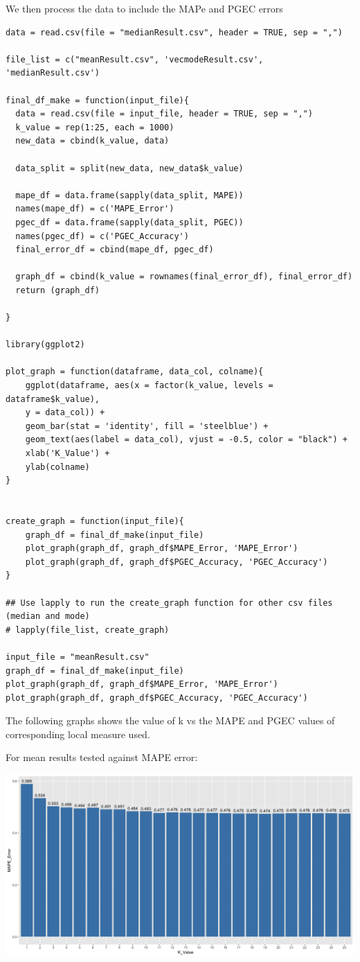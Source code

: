 \documentclass{article}
\begin{document}
We then process the data to include the MAPe and PGEC errors
\begin{verbatim}
data = read.csv(file = "medianResult.csv", header = TRUE, sep = ",")

file_list = c("meanResult.csv", 'vecmodeResult.csv', 'medianResult.csv')

final_df_make = function(input_file){
  data = read.csv(file = input_file, header = TRUE, sep = ",")
  k_value = rep(1:25, each = 1000)
  new_data = cbind(k_value, data)
  
  data_split = split(new_data, new_data$k_value)
  
  mape_df = data.frame(sapply(data_split, MAPE))
  names(mape_df) = c('MAPE_Error')
  pgec_df = data.frame(sapply(data_split, PGEC))
  names(pgec_df) = c('PGEC_Accuracy')
  final_error_df = cbind(mape_df, pgec_df)
  
  graph_df = cbind(k_value = rownames(final_error_df), final_error_df)
  return (graph_df)
  
}

library(ggplot2)

plot_graph = function(dataframe, data_col, colname){
    ggplot(dataframe, aes(x = factor(k_value, levels = dataframe$k_value),
    y = data_col)) +
    geom_bar(stat = 'identity', fill = 'steelblue') +
    geom_text(aes(label = data_col), vjust = -0.5, color = "black") +
    xlab('K_Value') +
    ylab(colname)
}


create_graph = function(input_file){
    graph_df = final_df_make(input_file)
    plot_graph(graph_df, graph_df$MAPE_Error, 'MAPE_Error')
    plot_graph(graph_df, graph_df$PGEC_Accuracy, 'PGEC_Accuracy')
}

## Use lapply to run the create_graph function for other csv files (median and mode)
# lapply(file_list, create_graph)

input_file = "meanResult.csv"
graph_df = final_df_make(input_file)
plot_graph(graph_df, graph_df$MAPE_Error, 'MAPE_Error')
plot_graph(graph_df, graph_df$PGEC_Accuracy, 'PGEC_Accuracy')

\end{verbatim}

The following graphs shows the value of k vs the MAPE and PGEC values of corresponding local measure used.

For mean results tested against MAPE error:

\includegraphics[scale=0.25]{Mean-MAPE.png}
\end{document}
